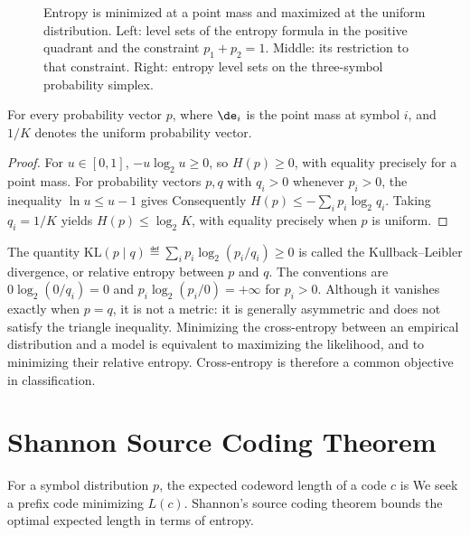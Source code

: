 \begin{figure}[tbp]
\centering
{}
\caption{Entropy is minimized at a point mass and maximized at the uniform distribution. Left: level sets of the entropy formula in the positive quadrant and the constraint $p_1+p_2=1$. Middle: its restriction to that constraint. Right: entropy level sets on the three-symbol probability simplex.}
\label{fig-entropy-extrema}
\end{figure}



\begin{lem} For every probability vector $p$,
where $\de_i$ is the point mass at symbol $i$, and $1/K$ denotes the uniform probability vector.
\end{lem}


\begin{proof}
For $u\in[0,1]$, $-u\log_2u\geq0$, so $H(p)\geq0$, with equality precisely for a point mass.
For probability vectors $p,q$ with $q_i>0$ whenever $p_i>0$, the inequality $\ln u\leq u-1$ gives
Consequently $H(p)\leq-\sum_i p_i\log_2q_i$. Taking $q_i=1/K$ yields $H(p)\leq\log_2K$, with equality precisely when $p$ is uniform.
\end{proof}

The quantity $\mathrm{KL}(p\mid q)\eqdef\sum_i p_i\log_2(p_i/q_i)\geq0$ is called the Kullback--Leibler divergence, or relative entropy between $p$ and $q$. The conventions are $0\log_2(0/q_i)=0$ and $p_i\log_2(p_i/0)=+\infty$ for $p_i>0$. Although it vanishes exactly when $p=q$, it is not a metric: it is generally asymmetric and does not satisfy the triangle inequality. Minimizing the cross-entropy between an empirical distribution and a model is equivalent to maximizing the likelihood, and to minimizing their relative entropy. Cross-entropy is therefore a common objective in classification.


\section{Shannon Source Coding Theorem}

For a symbol distribution $p$, the expected codeword length of a code $c$ is
We seek a prefix code minimizing $L(c)$.
%
Shannon's source coding theorem bounds the optimal expected length in terms of entropy.

